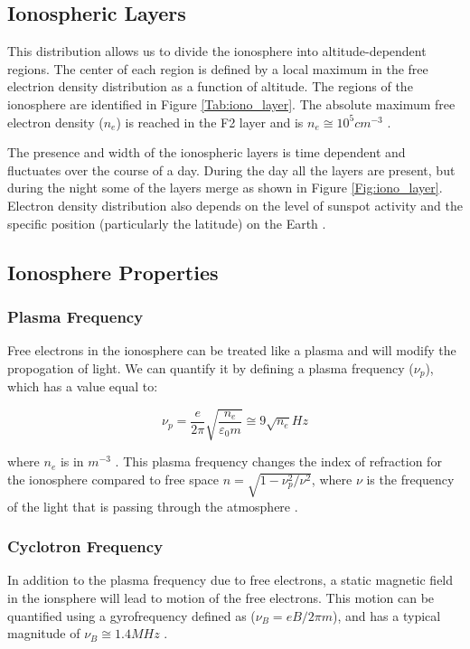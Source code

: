 \subsection{Ionospheric Layers}
This distribution allows us to divide the ionosphere into altitude-dependent regions. The center of each region is defined by a local maximum in the free electrion density distribution as a function of altitude. The regions of the ionosphere are identified in Figure \ref{Tab:iono_layer}. The absolute maximum free electron density ($n_e$) is reached in the F2 layer and is $n_e \cong 10^5 cm^{-3}$ \cite{ionospheres}. 

The presence and width of the ionospheric layers is time dependent and fluctuates over the course of a day. During the day all the layers are present, but during the night some of the layers merge as shown in Figure \ref{Fig:iono_layer}. Electron density distribution also depends on the level of sunspot activity and the specific position (particularly the latitude) on the Earth \cite{thompson_2001}. 

\subsection{Ionosphere Properties}

\subsubsection{Plasma Frequency}
Free electrons in the ionosphere can be treated like a plasma and will modify the propogation of light. We can quantify it by defining a plasma frequency ($\nu_p$), which has a value equal to:

\begin{equation}
\nu_p = \frac{e}{2 \pi} \sqrt{\frac{n_e}{\varepsilon_0 m}} \cong 9 \sqrt{n_e} Hz
\end{equation}

where $n_e$ is in $m^{-3}$ \cite{thompson_2001}. This plasma frequency changes the index of refraction for the ionosphere compared to free space $n = \sqrt{1-\nu_p^2/\nu^2}$, where $\nu$ is the frequency of the light that is passing through the atmosphere \cite{thompson_2001}. 

\subsubsection{Cyclotron Frequency}
In addition to the plasma frequency due to free electrons, a static magnetic field in the ionsphere will lead to motion of the free electrons. This motion can be quantified using a gyrofrequency defined as ($\nu_B = eB/2 \pi m$), and has a typical magnitude of $\nu_B \cong 1.4 MHz$ \cite{thompson_2001}. 

